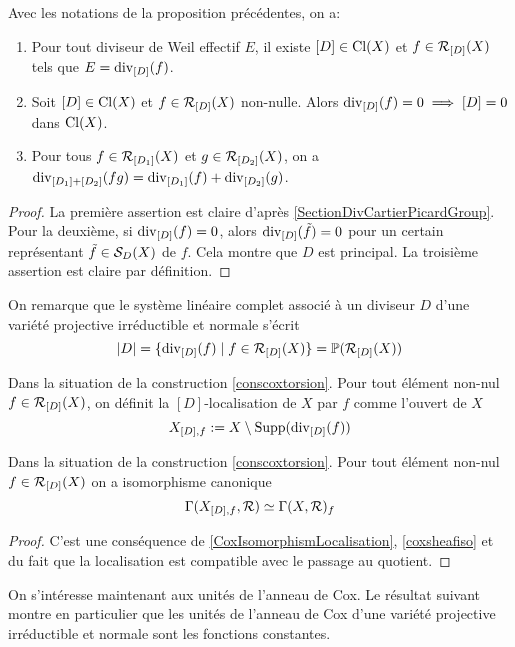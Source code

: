 \begin{prop}\label{diviCoxTorsFormulas}
Avec les notations de la proposition précédentes, on a:
\begin{enumerate}
\item Pour tout diviseur de Weil effectif $E$, il existe $[D]\in\operatorname{Cl}(X)$ et $f\in\mathcal{R}_{[D]}(X)$ tels que $E=\operatorname{div}_{[D]}(f)$.
\item Soit $[D]\in\operatorname{Cl}(X)$ et $f\in\mathcal{R}_{[D]}(X)$ non-nulle. Alors $\operatorname{div}_{[D]}(f)=0\implies [D]=0$ dans $\operatorname{Cl}(X)$.
\item Pour tous $f\in\mathcal{R}_{[D_1]}(X)$ et $g\in\mathcal{R}_{[D_2]}(X)$, on a $\operatorname{div}_{[D_1]+[D_2]}(fg)=\operatorname{div}_{[D_1]}(f)+\operatorname{div}_{[D_2]}(g)$.
\end{enumerate}
\end{prop}
\begin{proof}
La première assertion est claire d'après \ref{SectionDivCartierPicardGroup}. Pour la deuxième, si $\operatorname{div}_{[D]}(f)=0$, alors $\operatorname{div}_{[D]}(\tilde{f})=0$ pour un certain représentant $\tilde{f}\in\mathcal{S}_D(X)$ de $f$. Cela montre que $D$ est principal. La troisième assertion est claire par définition.
\end{proof}

On remarque que le système linéaire complet associé à un diviseur $D$ d'une variété projective irréductible et normale s'écrit
$$|D|=\lbrace\operatorname{div}_{[D]}(f)\mid f\in \mathcal{R}_{[D]}(X)\rbrace = \mathbb{P}(\mathcal{R}_{[D]}(X))$$

\begin{defn}
Dans la situation de la construction \ref{conscoxtorsion}. Pour tout élément non-nul $f\in\mathcal{R}_{[D]}(X)$, on définit la $[D]$-localisation de $X$ par $f$ comme l'ouvert de $X$
$$X_{[D],f}:=X\setminus\operatorname{Supp}(\operatorname{div}_{[D]}(f))$$
\end{defn}

\begin{prop}
Dans la situation de la construction \ref{conscoxtorsion}. Pour tout élément non-nul $f\in\mathcal{R}_{[D]}(X)$ on a isomorphisme canonique
$$\Gamma(X_{[D],f},\mathcal{R})\simeq \Gamma(X,\mathcal{R})_f$$
\end{prop}
\begin{proof}
C'est une conséquence de \ref{CoxIsomorphismLocalisation}, \ref{coxsheafiso} et du fait que la localisation est compatible avec le passage au quotient.
\end{proof}

On s'intéresse maintenant aux unités de l'anneau de Cox. Le résultat suivant montre en particulier que les unités de l'anneau de Cox d'une variété projective irréductible et normale sont les fonctions constantes.


